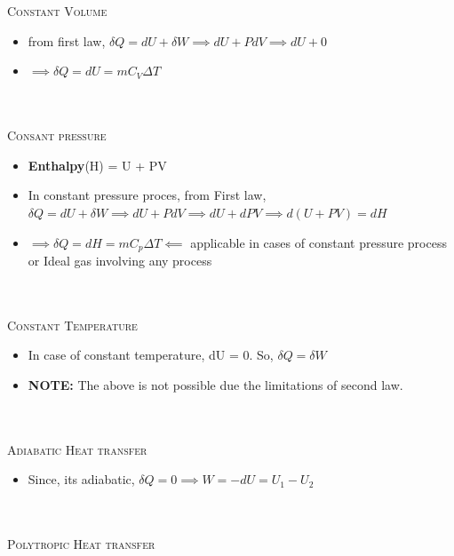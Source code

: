 \documentclass[8pt]{article}
\begin{document}
\\\\
\textsc{Constant Volume}
	\begin{itemize}
		\item from first law, $\delta Q = dU + \delta W \implies dU + PdV \implies dU + 0$
		\item $\implies \delta Q = dU = mC_V\Delta T$
	\end{itemize}\hrulefill\\\\
\textsc{Consant pressure}
	\begin{itemize}
		\item \textbf{Enthalpy}(H) = U + PV
		\item In constant pressure proces, from First law, $\delta Q = dU + \delta W \implies dU + PdV \implies dU + dPV \implies d(U+PV) = dH$
		\item $\implies \delta Q = dH = mC_p\Delta T \impliedby$ applicable in cases of constant pressure process or Ideal gas involving any process
	\end{itemize}\hrulefill\\\\
\textsc{Constant Temperature}
	\begin{itemize}
		\item In case of constant temperature, dU = 0. So, $\delta Q = \delta W$
		\item \textbf{NOTE: } The above is not possible due the limitations of second law.
	\end{itemize}\hrulefill\\\\
\textsc{Adiabatic Heat transfer}
	\begin{itemize}
		\item Since, its adiabatic, $\delta Q = 0 \implies W = -dU = U_1 - U_2$
	\end{itemize}\hrulefill\\\\
\textsc{Polytropic Heat transfer}
\end{document}
